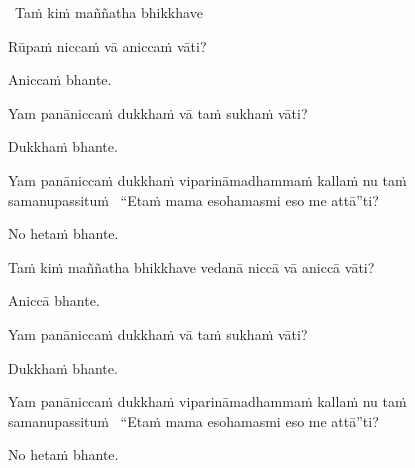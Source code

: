 \begin{pali-leader}
  \anglebracketleft\ \hspace{-0.5mm}Taṁ kiṁ maññatha bhikkhave \hspace{-0.5mm}\anglebracketright\
\end{pali-leader}
\begin{pali-hangtogether}
  Rūpaṁ niccaṁ vā aniccaṁ vāti?
\end{pali-hangtogether}
\begin{pali-hangtogether}
  Aniccaṁ bhante.
\end{pali-hangtogether}
\begin{pali-hangtogether}
  Yam panāniccaṁ dukkhaṁ vā taṁ sukhaṁ vāti?
\end{pali-hangtogether}
\begin{pali-hangtogether}
  Dukkhaṁ bhante.
\end{pali-hangtogether}
\begin{pali-hangtogether}
  Yam panāniccaṁ dukkhaṁ viparināmadhammaṁ kallaṁ nu taṁ samanupassituṁ \breathmark\ ``Etaṁ mama esohamasmi eso me attā''ti?
\end{pali-hangtogether}
\begin{pali-hangtogether}
  No hetaṁ bhante.
\end{pali-hangtogether}

\begin{pali-hang}
  Taṁ kiṁ maññatha bhikkhave vedanā niccā vā aniccā vāti?
\end{pali-hang}
\begin{pali-hangtogether}
  Aniccā bhante.
\end{pali-hangtogether}
\begin{pali-hangtogether}
  Yam panāniccaṁ dukkhaṁ vā taṁ sukhaṁ vāti?
\end{pali-hangtogether}
\begin{pali-hangtogether}
  Dukkhaṁ bhante.
\end{pali-hangtogether}
\begin{pali-hangtogether}
  Yam panāniccaṁ dukkhaṁ viparināmadhammaṁ kallaṁ nu taṁ samanupassituṁ \breathmark\ ``Etaṁ mama esohamasmi eso me attā''ti?
\end{pali-hangtogether}
\begin{pali-hangtogether}
  No hetaṁ bhante.
\end{pali-hangtogether}


